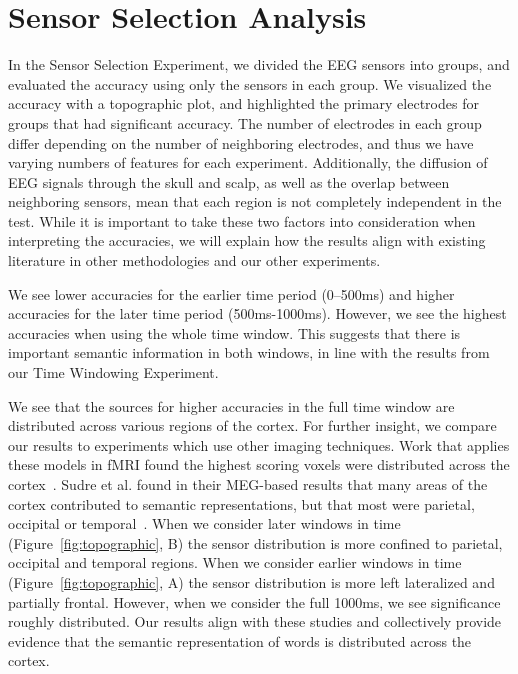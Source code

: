 \section{Sensor Selection Analysis}
In the Sensor Selection Experiment, we divided the EEG sensors into groups, and 
evaluated the \tvt accuracy using only the sensors in each group. We visualized 
the \tvt accuracy with a topographic plot, and highlighted the primary 
electrodes for groups that had significant accuracy. The number of electrodes 
in each group differ depending on the number of neighboring electrodes, and 
thus we have varying numbers of features for each \tvt experiment. 
Additionally, the diffusion of EEG signals through the skull and scalp, as well 
as the overlap between neighboring sensors, mean that each region is not 
completely independent in the \tvt test. While it is important to take these 
two factors into consideration when interpreting the accuracies, we will 
explain how the results align with existing literature in other methodologies 
and our other experiments.

We see lower \tvt accuracies for the earlier time period (0--500ms) and higher 
accuracies for the later time period (500ms-1000ms). However, we see the 
highest accuracies when using the whole time window. This suggests that there 
is important semantic information in both windows, in line with the results 
from our Time Windowing Experiment.

We see that the sources for higher accuracies in the full time window are 
distributed across various regions of the cortex. For further insight, we 
compare our results to experiments which use other imaging techniques. Work 
that applies these models in fMRI found the highest scoring voxels were 
distributed across the cortex~\cite{Mitchell2008, pereira2018toward}. Sudre et 
al. found in their MEG-based results that many areas of the cortex contributed 
to semantic representations, but that most were parietal, occipital or 
temporal~\cite{Sudre2012}. When we consider later windows in time 
(Figure~\ref{fig:topographic}, B) the sensor distribution is more confined to 
parietal, occipital and temporal regions. When we consider earlier windows in 
time (Figure~\ref{fig:topographic}, A) the sensor distribution is more left 
lateralized and partially frontal. However, when we consider the full 1000ms, 
we see significance roughly distributed.  Our results align with these studies 
and collectively provide evidence that the semantic representation of words is 
distributed across the cortex. 

